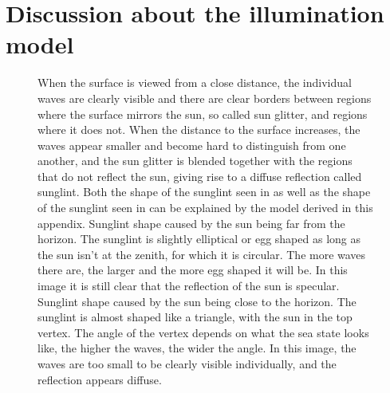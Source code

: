 \section{Discussion about the illumination model}

\begin{figure}
    \centering
    \caption{When the surface is viewed from a close distance, the individual waves are clearly visible and there are clear borders between regions where the surface mirrors the sun, so called sun glitter, and regions where it does not. When the distance to the surface increases, the waves appear smaller and become hard to distinguish from one another, and the sun glitter is blended together with the regions that do not reflect the sun, giving rise to a diffuse reflection called sunglint. Both the shape of the sunglint seen in  as well as the shape of the sunglint seen in  can be explained by the model derived in this appendix.
     Sunglint shape caused by the sun being far from the horizon. The sunglint is slightly elliptical or egg shaped as long as the sun isn't at the zenith, for which it is circular. The more waves there are, the larger and the more egg shaped it will be. In this image it is still clear that the reflection of the sun is specular.
     Sunglint shape caused by the sun being close to the horizon. The sunglint is almost shaped like a triangle, with the sun in the top vertex. The angle of the vertex depends on what the sea state looks like, the higher the waves, the wider the angle. In this image, the waves are too small to be clearly visible individually, and the reflection appears diffuse.
    }
    \label{fig:sunglints}
\end{figure}

